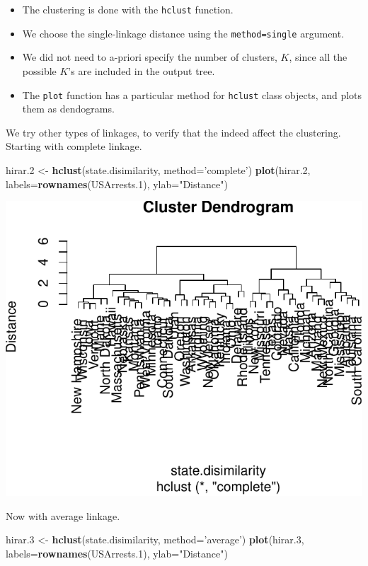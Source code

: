 \documentclass[]{book}
\newenvironment{Shaded}{\begin{snugshade}}{\end{snugshade}}
\newcommand{\KeywordTok}[1]{\textcolor[rgb]{0.13,0.29,0.53}{\textbf{#1}}}
\newcommand{\DataTypeTok}[1]{\textcolor[rgb]{0.13,0.29,0.53}{#1}}
\newcommand{\DecValTok}[1]{\textcolor[rgb]{0.00,0.00,0.81}{#1}}
\newcommand{\StringTok}[1]{\textcolor[rgb]{0.31,0.60,0.02}{#1}}
\newcommand{\NormalTok}[1]{#1}
\providecommand{\tightlist}{%
  \setlength{\itemsep}{0pt}\setlength{\parskip}{0pt}}
\theoremstyle{definition}
\theoremstyle{definition}
\theoremstyle{definition}
\theoremstyle{remark}
\begin{document}
\begin{itemize}
\tightlist
\item
  The clustering is done with the \texttt{hclust} function.
\item
  We choose the single-linkage distance using the
  \texttt{method=\textquotesingle{}single\textquotesingle{}} argument.
\item
  We did not need to a-priori specify the number of clusters, \(K\),
  since all the possible \(K\)'s are included in the output tree.
\item
  The \texttt{plot} function has a particular method for \texttt{hclust}
  class objects, and plots them as dendograms.
\end{itemize}

We try other types of linkages, to verify that the indeed affect the
clustering. Starting with complete linkage.

\begin{Shaded}
\begin{Highlighting}[]
\NormalTok{hirar.}\DecValTok{2}\NormalTok{ <-}\StringTok{ }\KeywordTok{hclust}\NormalTok{(state.disimilarity, }\DataTypeTok{method=}\StringTok{'complete'}\NormalTok{)}
\KeywordTok{plot}\NormalTok{(hirar.}\DecValTok{2}\NormalTok{, }\DataTypeTok{labels=}\KeywordTok{rownames}\NormalTok{(USArrests.}\DecValTok{1}\NormalTok{), }\DataTypeTok{ylab=}\StringTok{"Distance"}\NormalTok{)}
\end{Highlighting}
\end{Shaded}

\includegraphics[width=0.5\linewidth]{Rcourse_files/figure-latex/complete linkage-1}

Now with average linkage.

\begin{Shaded}
\begin{Highlighting}[]
\NormalTok{hirar.}\DecValTok{3}\NormalTok{ <-}\StringTok{ }\KeywordTok{hclust}\NormalTok{(state.disimilarity, }\DataTypeTok{method=}\StringTok{'average'}\NormalTok{)}
\KeywordTok{plot}\NormalTok{(hirar.}\DecValTok{3}\NormalTok{, }\DataTypeTok{labels=}\KeywordTok{rownames}\NormalTok{(USArrests.}\DecValTok{1}\NormalTok{), }\DataTypeTok{ylab=}\StringTok{"Distance"}\NormalTok{)}
\end{Highlighting}
\end{Shaded}
\end{document}
